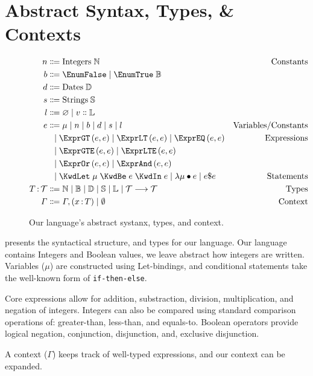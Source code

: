 \section{Abstract Syntax, Types, \& Contexts}\label{sec:defs}

\begin{figure}[ht]
  \centering
\begin{align*}
  n
  &
    \Coloneqq
    \text{Integers} \; \mathbb{N}
  & \text{Constants}
  \\
  b
  & \Coloneqq
    \EnumFalse \alt \EnumTrue \; \mathbb{B}
  \\
  d
  & \Coloneqq
    \text{Dates} \; \mathbb{D}
  \\
  s
  & \Coloneqq
    \text{Strings} \; \mathbb{S}
  \\
  l
  & \Coloneqq
    \varnothing \alt v \Cons \mathbb{L}
  \\
  e
  &
    \Coloneqq
    \mu
    \alt
    n
    \alt
    b
    \alt
    d
    \alt
    s
    \alt
    l
  & \text{Variables/Constants}
  \\
  &
    \firstAlt
    \exprGT{e}{e}
    \alt
    \exprLT{e}{e}
    \alt
    \exprEQ{e}{e}
  & \text{Expressions}
  \\
  & \firstAlt
    \exprGTE{e}{e}
    \alt
    \exprLTE{e}{e}
  &
  \\
  & \firstAlt
    \exprOr{e}{e}
    \alt
    \exprAnd{e}{e}
  &
  \\
  &
    \firstAlt
    \stmtLet{\mu}{e}{e}
    \alt
    {\lambda \mu \bullet e }
    \alt
    e \$ e
  &
    \text{Statements}
  \\
  \ty{T}{\mathcal{T}}
  &
    \Coloneqq
    \mathbb{N}
    \alt
    \mathbb{B}
    \alt
    \mathbb{D}
    \alt
    \mathbb{S}
    \alt
    \mathbb{L}
    \alt
    {\mathcal{T}\longrightarrow \mathcal{T}}
  &
    \text{Types}
  \\
  \Gamma
  &
    \Coloneqq
    \envAdd{(\ty{x}{T})}
    \alt
    \emptyset
    &
      \text{Context}
\end{align*}
  \caption{\label{fig:syntax}Our language's abstract systanx, types, and context.}
\end{figure}

 presents the syntactical structure, and types for our language.
Our language contains Integers and Boolean values, we leave abstract how integers are written.
Variables ($\mu$) are constructed using Let-bindings, and conditional statements take the well-known form of \texttt{if-then-else}.

Core expressions allow for addition, substraction, division, multiplication, and negation of integers.
Integers can also be compared using standard comparison operations of: greater-than, less-than, and equals-to.
Boolean operators provide logical negation, conjunction, disjunction, and, exclusive disjunction.

A context ($\Gamma$) keeps track of well-typed expressions, and our context can be expanded.
